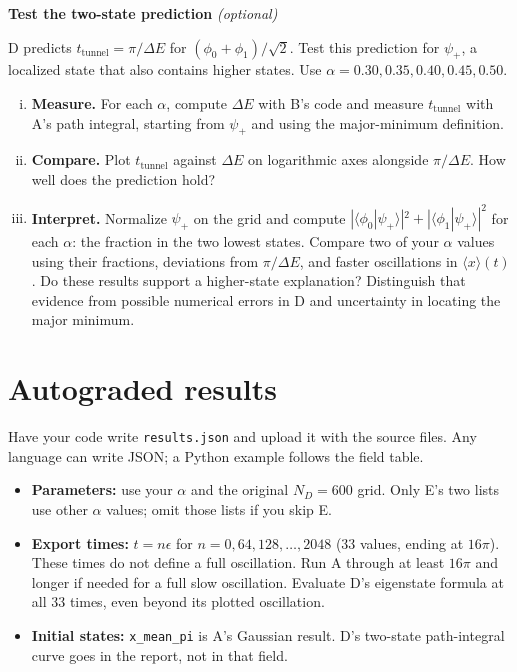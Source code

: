 \newpage
\begin{problem}[10 bonus]
  \textbf{Test the two-state prediction} \emph{(optional)}

  D predicts $t_\mathrm{tunnel}=\pi/\Delta E$ for $(\phi_0+\phi_1)/\sqrt{2}$.
  Test this prediction for $\psi_+$, a localized state that also contains higher states.
  Use $\alpha=0.30,0.35,0.40,0.45,0.50$.
  \begin{enumerate}[(i)]
    \item \textbf{Measure.} For each $\alpha$, compute $\Delta E$ with B's code and measure $t_\mathrm{tunnel}$ with A's path integral, starting from $\psi_+$ and using the major-minimum definition.
    \item \textbf{Compare.} Plot $t_\mathrm{tunnel}$ against $\Delta E$ on logarithmic axes alongside $\pi/\Delta E$. How well does the prediction hold?
    \item \textbf{Interpret.} Normalize $\psi_+$ on the grid and compute
          $|\langle\phi_0|\psi_+\rangle|^2+|\langle\phi_1|\psi_+\rangle|^2$
          for each $\alpha$: the fraction in the two lowest states.
          Compare two of your $\alpha$ values using their fractions, deviations from $\pi/\Delta E$, and faster oscillations in $\langle x\rangle(t)$.
          Do these results support a higher-state explanation?
          Distinguish that evidence from possible numerical errors in D and uncertainty in locating the major minimum.
  \end{enumerate}
\end{problem}

\begin{solution}
\end{solution}

\section*{Autograded results}
Have your code write \texttt{results.json} and upload it with the source files.
Any language can write JSON; a Python example follows the field table.

\begin{itemize}
  \item \textbf{Parameters:} use your $\alpha$ and the original $N_D=600$ grid.
        Only E's two lists use other $\alpha$ values; omit those lists if you skip E.
  \item \textbf{Export times:} $t=n\epsilon$ for $n=0,64,128,\ldots,2048$ (33 values, ending at $16\pi$).
        These times do not define a full oscillation. Run A through at least $16\pi$ and longer if needed for a full slow oscillation.
        Evaluate D's eigenstate formula at all 33 times, even beyond its plotted oscillation.
  \item \textbf{Initial states:} \texttt{x\_mean\_pi} is A's Gaussian result.
        D's two-state path-integral curve goes in the report, not in that field.
\end{itemize}

